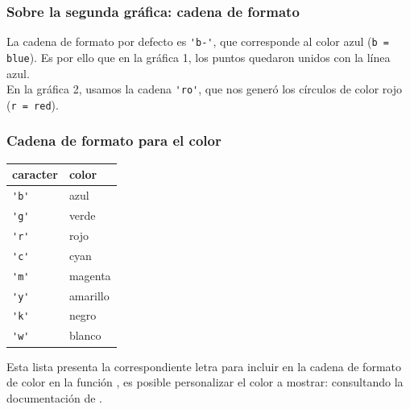 \begin{frame}[fragile]
\frametitle{Sobre la segunda gráfica: cadena de formato}
La cadena de formato por defecto es \verb|'b-'|, que corresponde al color azul (\verb|b = blue|). Es por ello que en la gráfica 1, los puntos quedaron unidos con la línea azul.
\\
\bigskip
En la gráfica 2, usamos la cadena \verb|'ro'|, que nos generó los círculos de color rojo (\verb|r = red|).
\end{frame}
\begin{frame}[fragile]
\frametitle{Cadena de formato para el color}
\begin{minipage}{0.4\linewidth}
\fontsize{12}{10}\selectfont
\begin{tabular}{l | l}
caracter & color \\ \hline
\verb|'b'| & azul \\ \hline
\verb|'g'| & verde \\ \hline
\verb|'r'| & rojo \\ \hline
\verb|'c'| & cyan \\ \hline
\verb|'m'| & magenta \\ \hline
\verb|'y'| & amarillo \\ \hline
\verb|'k'| & negro \\ \hline
\verb|'w'| & blanco
\end{tabular}
\end{minipage}
\hspace{0.3cm}
\begin{minipage}{0.5\linewidth}
\fontsize{13}{12}\selectfont
Esta lista presenta la correspondiente letra para incluir en la cadena de formato de color en la función , es posible personalizar el color a mostrar: consultando la documentación de .
\end{minipage}
\end{frame}
